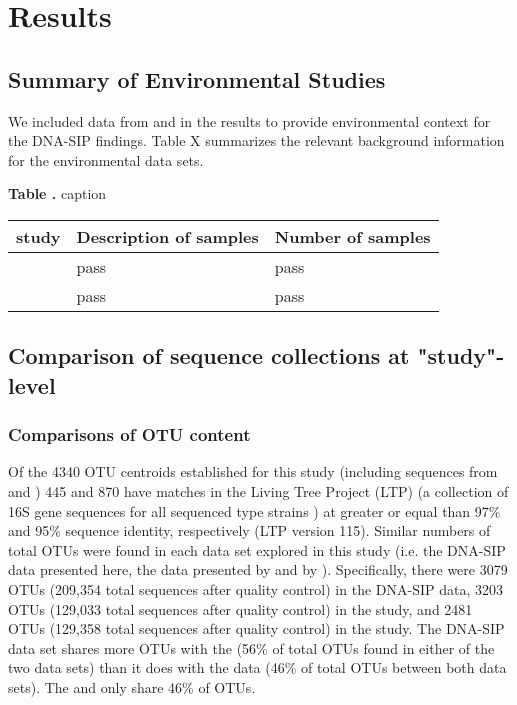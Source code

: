 \section{Results}
\subsection{Summary of Environmental Studies}
We included data from \citet{Garcia_Pichel_2013} and \citet{Steven_2013}
in the results to provide environmental context for the DNA-SIP
findings. Table X summarizes the relevant background information
for the environmental data sets.
\begin{table}

\textbf{
\label{table:study_summary}
Table .
}
{caption} 
{\centering
\begin{tabular}{lll}
\toprule
study & Description of samples & Number of samples \\ 
\midrule
\citet{Garcia_Pichel_2013} & pass & pass \\ \midrule
\citet{Steven_2013} & pass & pass \\
\bottomrule
\end{tabular}}{}
\end{table}

\subsection{Comparison of sequence collections at "study"-level}

\subsubsection{Comparisons of OTU content}
Of the 4340 OTU centroids established for this study (including sequences from \citet{Steven_2013} and \citep{Garcia_Pichel_2013}) 445 and 870 have matches in the Living Tree Project (LTP) (a collection of 16S gene sequences for all sequenced type strains \citep{Yarza_2008}) at greater or equal than 97\% and 95\% sequence identity, respectively (LTP version 115). Similar numbers of total OTUs were found in each data set explored in this study (i.e. the DNA-SIP data presented here, the data presented by \citet{Steven_2013} and by \citet{Garcia_Pichel_2013}). Specifically, there were 3079 OTUs (209,354 total sequences after quality control) in the DNA-SIP data, 3203 OTUs (129,033 total sequences after quality control) in the \citet{Garcia_Pichel_2013} study, and 2481 OTUs (129,358 total sequences after quality control) in the \citet{Steven_2013} study. The DNA-SIP data set shares more OTUs with the \citet{Steven_2013} (56\% of total OTUs found in either of the two data sets) than it does with the \citet{Garcia_Pichel_2013} data (46\% of total OTUs between both data sets). The \citet{Steven_2013} and \citet{Garcia_Pichel_2013} only share 46\% of OTUs.

